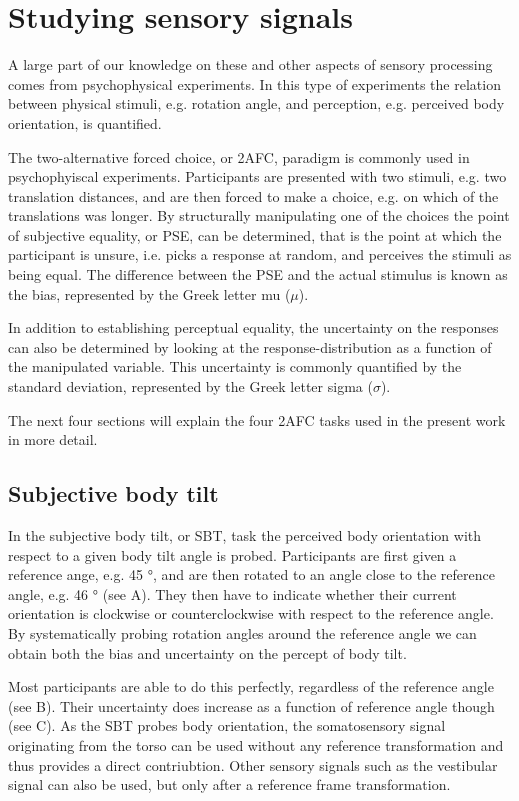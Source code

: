 \section{Studying sensory signals}
A large part of  our knowledge on these and other aspects of sensory processing comes from psychophysical experiments. In this type of experiments the relation between physical stimuli, e.g. rotation angle, and perception, e.g. perceived body orientation, is quantified.

The two-alternative forced choice, or 2AFC, paradigm is commonly used in psychophyiscal experiments. Participants are presented with two stimuli, e.g. two translation distances, and are then forced to make a choice, e.g. on which of the translations was longer. By structurally manipulating one of the choices the point of subjective equality, or PSE, can be determined, that is the point at which the participant is unsure, i.e. picks a response at random, and perceives the stimuli as being equal. The difference between the PSE and the actual stimulus is known as the bias, represented by the Greek letter mu ($\mu$).

In addition to establishing perceptual equality, the uncertainty on the responses can also be determined by looking at the response-distribution as a function of the manipulated variable. This uncertainty is commonly quantified by the standard deviation, represented by the Greek letter sigma ($\sigma$).

The next four sections will explain the four 2AFC tasks used in the present work in more detail.

\subsection{Subjective body tilt}
In the subjective body tilt, or SBT, task the perceived body orientation with respect to a given body tilt angle is probed. Participants are first given a reference ange, e.g. 45 \si{\degree}, and are then rotated to an angle close to the reference angle, e.g. 46 \si{\degree} (see A). They then have to indicate whether their current orientation is clockwise or counterclockwise with respect to the reference angle. By systematically probing rotation angles around the reference angle we can obtain both the bias and uncertainty on the percept of body tilt.

Most participants are able to do this perfectly, regardless of the reference angle (see B). Their uncertainty does increase as a function of reference angle though (see C).
As the SBT probes body orientation, the somatosensory signal originating from the torso can be used without any reference transformation and thus provides a direct contriubtion. Other sensory signals such as the vestibular signal can also be used, but only after a reference frame transformation.

